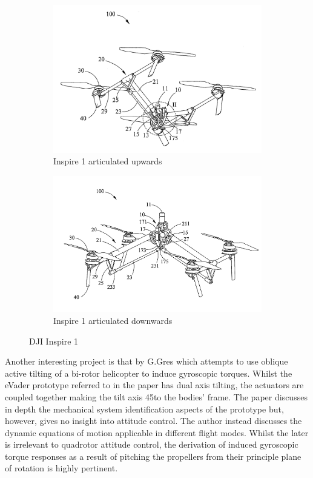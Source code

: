 \begin{figure}[htbp]
\centering
\begin{subfigure}{.5\textwidth}
\centering
\includegraphics[width=\textwidth]{figs/dji-inspire1}
\caption{Inspire 1 articulated upwards}
\label{fig:inspireup}
\end{subfigure}%
\begin{subfigure}{.5\textwidth}
\centering
\includegraphics[width=\textwidth]{figs/dji-inspire2}
\caption{Inspire 1 articulated downwards}
\label{fig:inspiredown}
\end{subfigure}
\caption{DJI Inspire 1}
\label{fig:inspire1}
\end{figure}
\par
Another interesting project is that by G.Gres \cite{gres2007} which attempts to use oblique active tilting of a bi-rotor helicopter to induce gyroscopic torques. Whilst the eVader prototype referred to in the paper has dual axis tilting, the actuators are coupled together making the tilt axis 45\textdegree to the bodies' frame. The paper discusses in depth the mechanical system identification aspects of the prototype but, however, gives no insight into attitude control. The author instead discusses the dynamic equations of motion applicable in different flight modes. Whilst the later is irrelevant to quadrotor attitude control, the derivation of induced gyroscopic torque responses as a result of pitching the propellers from their principle plane of rotation is highly pertinent.
\par

